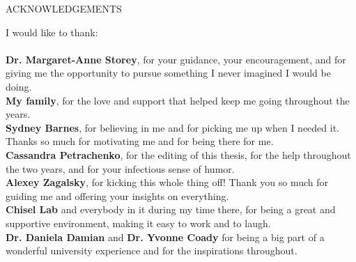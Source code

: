 \newpage
{}

\begin{center}
ACKNOWLEDGEMENTS
\end{center}

\noindent I would like to thank: \\ \\
\textbf{Dr. Margaret-Anne Storey}, for your guidance, your encouragement, and for giving me the opportunity to pursue something I never imagined I would be doing. \\
\textbf{My family}, for the love and support that helped keep me going throughout the years. \\
\textbf{Sydney Barnes}, for believing in me and for picking me up when I needed it. Thanks so much for motivating me and for being there for me. \\
\textbf{Cassandra Petrachenko}, for the editing of this thesis, for the help throughout the two years, and for your infectious sense of humor. \\
\textbf{Alexey Zagalsky}, for kicking this whole thing off! Thank you so much for guiding me and offering your insights on everything. \\
\textbf{Chisel Lab} and everybody in it during my time there, for being a great and supportive environment, making it easy to work and to laugh. \\
\textbf{Dr. Daniela Damian} and \textbf{Dr. Yvonne Coady} for being a big part of a wonderful university experience and for the inspirations throughout. \\

